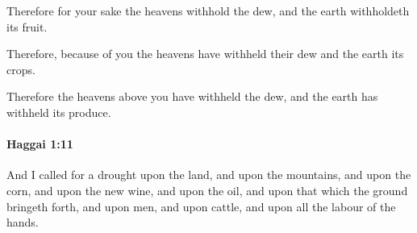 			\begin{versebox}
					\item[BHS] 
					\item[LXX] 
					\item[ASV] Therefore for your sake the heavens withhold the dew, and the earth withholdeth its fruit.
					\item[NIV] Therefore, because of you the heavens have withheld their dew and the earth its crops.
					\item[NRSV] Therefore the heavens above you have withheld the dew, and the earth has withheld its produce.
			\end{versebox}

		\paragraph{Haggai 1:11} %
			\label{HAGGAI-1-11}

			And I called for a drought upon the land, and upon the mountains, and upon the corn, and upon the new wine, and upon the oil, and upon that which the ground bringeth forth, and upon men, and upon cattle, and upon all the labour of the hands.

